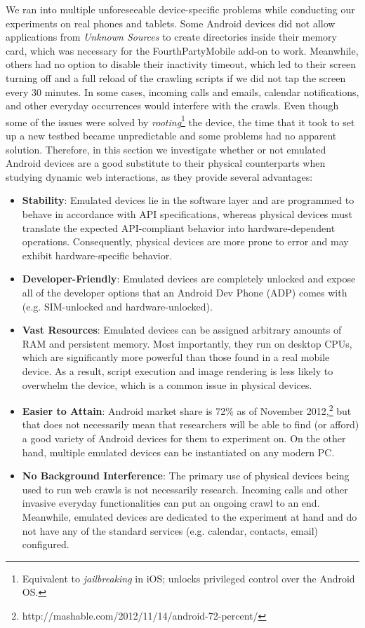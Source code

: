 \documentclass{acm_proc_article-sp}
\begin{document}
We ran into multiple unforeseeable device-specific problems while conducting our experiments on real phones and tablets. Some Android devices did not allow applications from \emph{Unknown Sources} to create directories inside their memory card, which was necessary for the FourthPartyMobile add-on to work. Meanwhile, others had no option to disable their inactivity timeout, which led to their screen turning off and a full reload of the crawling scripts if we did not tap the screen every 30 minutes. In some cases, incoming calls and emails, calendar notifications, and other everyday occurrences would interfere with the crawls. Even though some of the issues were solved by \emph{rooting}\footnote{Equivalent to \emph{jailbreaking} in iOS; unlocks privileged control over the Android OS.} the device, the time that it took to set up a new testbed became unpredictable and some problems had no apparent solution. Therefore, in this section we investigate whether or not emulated Android devices are a good substitute to their physical counterparts when studying dynamic web interactions, as they provide several advantages:

\begin{itemize}
\item \textbf{Stability}: Emulated devices lie in the software layer and are programmed to behave in accordance with API specifications, whereas physical devices must translate the expected API-compliant behavior into hardware-dependent operations. Consequently, physical devices are more prone to error and may exhibit hardware-specific behavior.

\item \textbf{Developer-Friendly}: Emulated devices are completely unlocked and expose all of the developer options that an Android Dev Phone (ADP) comes with (e.g. SIM-unlocked and hardware-unlocked).

\item \textbf{Vast Resources}: Emulated devices can be assigned arbitrary amounts of RAM and persistent memory. Most importantly, they run on desktop CPUs, which are significantly more powerful than those found in a real mobile device. As a result, script execution and image rendering is less likely to overwhelm the device, which is a common issue in physical devices.

\item \textbf{Easier to Attain}: Android market share is 72\% as of November 2012,\footnote{http://mashable.com/2012/11/14/android-72-percent/} but that does not necessarily mean that researchers will be able to find (or afford) a good variety of Android devices for them to experiment on. On the other hand, multiple emulated devices can be instantiated on any modern PC.

\item \textbf{No Background Interference}: The primary use of physical devices being used to run web crawls is not necessarily research. Incoming calls and other invasive everyday functionalities can put an ongoing crawl to an end. Meanwhile, emulated devices are dedicated to the experiment at hand and do not have any of the standard services (e.g. calendar, contacts, email) configured.
\end{itemize} 
\end{document}
